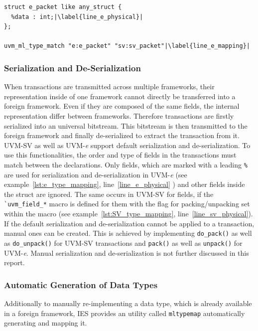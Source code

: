 \lstset{language=e, numbers = left, escapechar=|, breaklines=true}
\begin{lstlisting}[frame=htrbl, caption={\textit{e}: mapping \lstinline$sv_packet$ onto \lstinline$e_packet$},
label={lst:e_type_mapping}]
struct e_packet like any_struct {
  %data : int;|\label{line_e_physical}|
};

uvm_ml_type_match "e:e_packet" "sv:sv_packet"|\label{line_e_mapping}|
\end{lstlisting}

\subsubsection{Serialization and De-Serialization}
When transactions are transmitted across multiple frameworks, their representation inside of one framework cannot
directly be transferred into a foreign framework. Even if they are composed of the same fields, the internal
representation differ between frameworks. Therefore transactions are firstly serialized into an universal bitstream.
This bitstream is then transmitted to the foreign framework and finally de-serialized to extract the transaction from
it.\\
UVM-SV as well as UVM-\textit{e} support default serialization and de-serialization. To use this
functionalities,  the order and type of fields in the transactions must match between the declarations. Only fields,
which are marked with a leading \lstinline$%$ are used for serialization and de-serialization in UVM-\textit{e} (see
example~\ref{lst:e_type_mapping}, line~\ref{line_e_physical} ) and other fields inside the struct are ignored. The same
occurs in UVM-SV for fields, if the \lstinline$`uvm_field_*$ macro is defined for them with the flag for
packing/unpacking set within the macro (see example~\ref{lst:SV_type_mapping}, line~\ref{line_sv_physical}).\\
If the default serialization and de-serialization cannot be applied to a transaction, manual ones can be created. This is achieved by
implementing \lstinline$do_pack()$ as well as \lstinline$do_unpack()$ for UVM-SV transactions and
\lstinline$pack()$ as well as \lstinline$unpack()$ for UVM-\textit{e}. Manual serialization and de-serialization is not further discussed in this report. 
\subsubsection{Automatic Generation of Data Types}
Additionally to manually re-implementing a data type, which is already available in a foreign framework, IES provides an utility called \lstinline$mltypemap$ automatically generating and mapping it.
